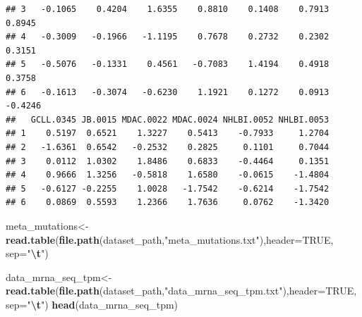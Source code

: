 \documentclass[
]{article}
\newenvironment{Shaded}{\begin{snugshade}}{\end{snugshade}}
\newcommand{\AttributeTok}[1]{\textcolor[rgb]{0.13,0.29,0.53}{#1}}
\newcommand{\ConstantTok}[1]{\textcolor[rgb]{0.56,0.35,0.01}{#1}}
\newcommand{\FunctionTok}[1]{\textcolor[rgb]{0.13,0.29,0.53}{\textbf{#1}}}
\newcommand{\NormalTok}[1]{#1}
\newcommand{\OtherTok}[1]{\textcolor[rgb]{0.56,0.35,0.01}{#1}}
\newcommand{\SpecialCharTok}[1]{\textcolor[rgb]{0.81,0.36,0.00}{\textbf{#1}}}
\newcommand{\StringTok}[1]{\textcolor[rgb]{0.31,0.60,0.02}{#1}}
\begin{document}
\begin{verbatim}
## 3   -0.1065    0.4204    1.6355    0.8810    0.1408    0.7913    0.8945
## 4   -0.3009   -0.1966   -1.1195    0.7678    0.2732    0.2302    0.3151
## 5   -0.5076   -0.1331    0.4561   -0.7083    1.4194    0.4918    0.3758
## 6   -0.1613   -0.3074   -0.6230    1.1921    0.1272    0.0913   -0.4246
##   GCLL.0345 JB.0015 MDAC.0022 MDAC.0024 NHLBI.0052 NHLBI.0053
## 1    0.5197  0.6521    1.3227    0.5413    -0.7933     1.2704
## 2   -1.6361  0.6542   -0.2532    0.2825     0.1101     0.7044
## 3    0.0112  1.0302    1.8486    0.6833    -0.4464     0.1351
## 4    0.9666  1.3256   -0.5818    1.6580    -0.0615    -1.4804
## 5   -0.6127 -0.2255    1.0028   -1.7542    -0.6214    -1.7542
## 6    0.0869  0.5593    1.2366    1.7636     0.0762    -1.3420
\end{verbatim}

\begin{Shaded}
\begin{Highlighting}[]
\NormalTok{meta\_mutations}\OtherTok{\textless{}{-}} \FunctionTok{read.table}\NormalTok{(}\FunctionTok{file.path}\NormalTok{(dataset\_path,}\StringTok{"meta\_mutations.txt"}\NormalTok{),}\AttributeTok{header=}\ConstantTok{TRUE}\NormalTok{, }\AttributeTok{sep=}\StringTok{"}\SpecialCharTok{\textbackslash{}t}\StringTok{"}\NormalTok{)}

\NormalTok{data\_mrna\_seq\_tpm}\OtherTok{\textless{}{-}} \FunctionTok{read.table}\NormalTok{(}\FunctionTok{file.path}\NormalTok{(dataset\_path,}\StringTok{"data\_mrna\_seq\_tpm.txt"}\NormalTok{),}\AttributeTok{header=}\ConstantTok{TRUE}\NormalTok{, }\AttributeTok{sep=}\StringTok{"}\SpecialCharTok{\textbackslash{}t}\StringTok{"}\NormalTok{)}
\FunctionTok{head}\NormalTok{(data\_mrna\_seq\_tpm)}
\end{Highlighting}
\end{Shaded}
\end{document}
